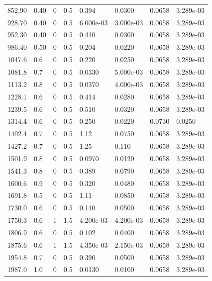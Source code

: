 \documentclass[preview]{standalone}
\begin{document}
{{\begin{tabular}{L{1.2cm}C{1.2cm} C{0.3cm}C{0.5cm} C{1.4cm}C{1.4cm} C{1.4cm}C{1.4cm}}
  852.90  &  0.40  & 0     & 0.5 &  0.394  & 0.0300  & 0.0658 &  3.289e-03   \\ 
  928.70  &  0.40  & 0     & 0.5 &  6.000e-03  & 3.000e-03  & 0.0658 &  3.289e-03   \\ 
  952.30  &  0.40  & 0     & 0.5 &  0.410  & 0.0300  & 0.0658 &  3.289e-03   \\ 
  986.40  &  0.50  & 0     & 0.5 &  0.204  & 0.0220  & 0.0658 &  3.289e-03   \\ 
  1047.6  &   0.6  & 0     & 0.5 &  0.220  & 0.0250  & 0.0658 &  3.289e-03   \\ 
  1081.8  &   0.7  & 0     & 0.5 &  0.0330  & 5.000e-03  & 0.0658 &  3.289e-03   \\ 
  1113.2  &   0.8  & 0     & 0.5 &  0.0370  & 4.000e-03  & 0.0658 &  3.289e-03   \\ 
  1228.1  &   0.6  & 0     & 0.5 &  0.414  & 0.0280  & 0.0658 &  3.289e-03   \\ 
  1239.5  &   0.6  & 0     & 0.5 &  0.510  & 0.0320  & 0.0658 &  3.289e-03   \\ 
  1314.4  &   0.6  & 0     & 0.5 &  0.250  & 0.0220  & 0.0730 &  0.0250   \\ 
  1402.4  &   0.7  & 0     & 0.5 &  1.12  & 0.0750  & 0.0658 &  3.289e-03   \\ 
  1427.2  &   0.7  & 0     & 0.5 &  1.25  & 0.110  & 0.0658 &  3.289e-03   \\ 
  1501.9  &   0.8  & 0     & 0.5 &  0.0970  & 0.0120  & 0.0658 &  3.289e-03   \\ 
  1541.3  &   0.8  & 0     & 0.5 &  0.389  & 0.0790  & 0.0658 &  3.289e-03   \\ 
  1600.6  &   0.9  & 0     & 0.5 &  0.320  & 0.0480  & 0.0658 &  3.289e-03   \\ 
  1691.8  &   0.5  & 0     & 0.5 &  1.11  & 0.0850  & 0.0658 &  3.289e-03   \\ 
  1730.0  &   0.6  & 0     & 0.5 &  0.140  & 0.0500  & 0.0658 &  3.289e-03   \\ 
  1750.3  &   0.6  & 1     & 1.5 &  4.200e-03  & 4.200e-03  & 0.0658 &  3.289e-03   \\ 
  1806.9  &   0.6  & 0     & 0.5 &  0.102  & 0.0400  & 0.0658 &  3.289e-03   \\ 
  1875.6  &   0.6  & 1     & 1.5 &  4.350e-03  & 2.150e-03  & 0.0658 &  3.289e-03   \\ 
  1954.8  &   0.7  & 0     & 0.5 &  0.390  & 0.0500  & 0.0658 &  3.289e-03   \\ 
  1987.0  &   1.0  & 0     & 0.5 &  0.0130  & 0.0100  & 0.0658 &  3.289e-03   \\ 

\end{tabular}}}
\end{document}
